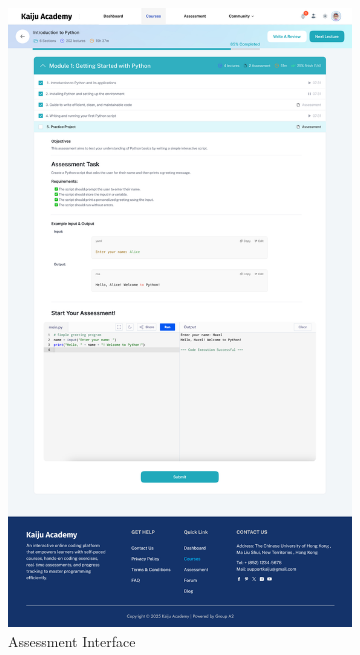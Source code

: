 \documentclass[a4paper, 11pt]{scrreprt}
\begin{document}
\begin{figure}[ht]
\begin{subfigure}[b]{0.32\textwidth}
        \includegraphics[width=\textwidth]{UI/Assessment.jpg}
        \caption{Assessment Interface}
    \end{subfigure}
    \hfill
    \begin{subfigure}[b]{0.32\textwidth}
        \centering

\end{subfigure}
\end{figure}
\end{document}
